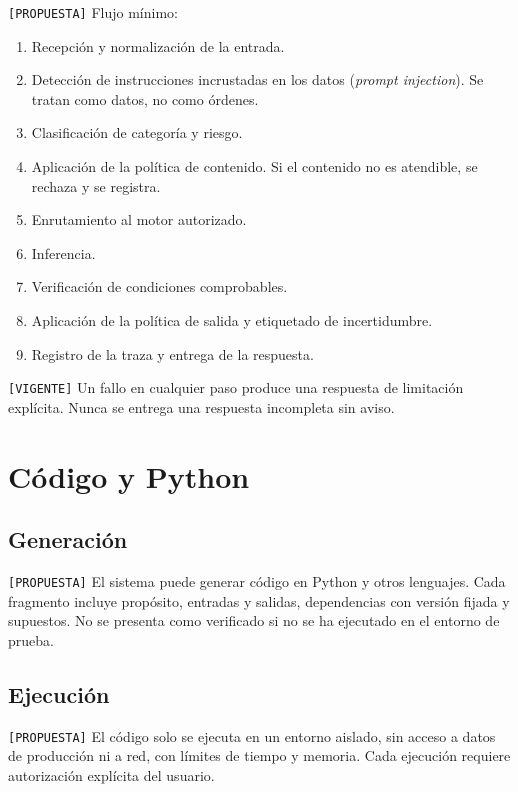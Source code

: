\documentclass[12pt]{article}
\begin{document}
\texttt{[PROPUESTA]} Flujo mínimo:

\begin{enumerate}
    \item Recepción y normalización de la entrada.
    \item Detección de instrucciones incrustadas en los datos (\emph{prompt injection}). Se tratan como datos, no como órdenes.
    \item Clasificación de categoría y riesgo.
    \item Aplicación de la política de contenido. Si el contenido no es atendible, se rechaza y se registra.
    \item Enrutamiento al motor autorizado.
    \item Inferencia.
    \item Verificación de condiciones comprobables.
    \item Aplicación de la política de salida y etiquetado de incertidumbre.
    \item Registro de la traza y entrega de la respuesta.
\end{enumerate}

\texttt{[VIGENTE]} Un fallo en cualquier paso produce una respuesta de
limitación explícita. Nunca se entrega una respuesta incompleta sin aviso.

\section{Código y Python}
\label{sec:codigo}

\subsection{Generación}

\texttt{[PROPUESTA]} El sistema puede generar código en Python y otros
lenguajes. Cada fragmento incluye propósito, entradas y salidas,
dependencias con versión fijada y supuestos. No se presenta como verificado
si no se ha ejecutado en el entorno de prueba.

\subsection{Ejecución}

\texttt{[PROPUESTA]} El código solo se ejecuta en un entorno aislado, sin
acceso a datos de producción ni a red, con límites de tiempo y memoria. Cada
ejecución requiere autorización explícita del usuario.
\end{document}

